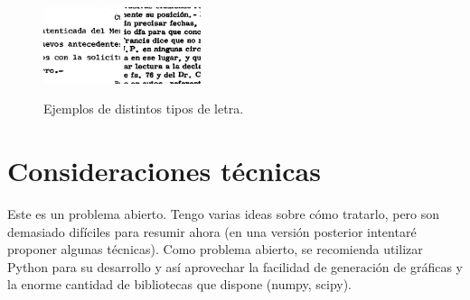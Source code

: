 \documentclass[11pt,a4paper]{article}
\begin{document}
\begin{figure}
\includegraphics[width=0.2\textwidth]{r0566_0569.jpg}%
\includegraphics[width=0.2\textwidth]{r0566_0599.jpg}\\
\caption{\label{fig:letras}Ejemplos de distintos tipos de letra.}
\end{figure}

\section{Consideraciones técnicas}

Este es un problema abierto. Tengo varias ideas sobre cómo tratarlo, pero son demasiado difíciles para resumir ahora (en una versión posterior intentaré proponer algunas técnicas). Como problema abierto, se recomienda utilizar Python para su desarrollo y así aprovechar la facilidad de generación de gráficas y la enorme cantidad de bibliotecas que dispone (numpy, scipy).
\end{document}
